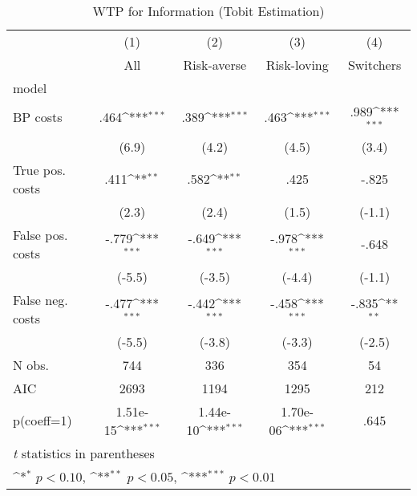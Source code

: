\begin{table}[htbp]\centering
\def\sym#1{\ifmmode^{#1}\else\(^{#1}\)\fi}
\caption{WTP for Information (Tobit Estimation)}
\begin{tabular}{l*{4}{c}}
\hline\hline
                &\multicolumn{1}{c}{(1)}&\multicolumn{1}{c}{(2)}&\multicolumn{1}{c}{(3)}&\multicolumn{1}{c}{(4)}\\
                &\multicolumn{1}{c}{All}&\multicolumn{1}{c}{Risk-averse}&\multicolumn{1}{c}{Risk-loving}&\multicolumn{1}{c}{Switchers}\\
\hline
model           &                  &                  &                  &                  \\
BP costs        &     .464\sym{***}&     .389\sym{***}&     .463\sym{***}&     .989\sym{***}\\
                &    (6.9)         &    (4.2)         &    (4.5)         &    (3.4)         \\
True pos. costs &     .411\sym{**} &     .582\sym{**} &     .425         &    -.825         \\
                &    (2.3)         &    (2.4)         &    (1.5)         &   (-1.1)         \\
False pos. costs&    -.779\sym{***}&    -.649\sym{***}&    -.978\sym{***}&    -.648         \\
                &   (-5.5)         &   (-3.5)         &   (-4.4)         &   (-1.1)         \\
False neg. costs&    -.477\sym{***}&    -.442\sym{***}&    -.458\sym{***}&    -.835\sym{**} \\
                &   (-5.5)         &   (-3.8)         &   (-3.3)         &   (-2.5)         \\
\hline
N obs.          &      744         &      336         &      354         &       54         \\
AIC             &     2693         &     1194         &     1295         &      212         \\
p(coeff=1)      & 1.51e-15\sym{***}& 1.44e-10\sym{***}& 1.70e-06\sym{***}&     .645         \\
\hline\hline
\multicolumn{5}{l}{\footnotesize \textit{t} statistics in parentheses}\\
\multicolumn{5}{l}{\footnotesize \sym{*} \(p<0.10\), \sym{**} \(p<0.05\), \sym{***} \(p<0.01\)}\\
\end{tabular}
\end{table}
